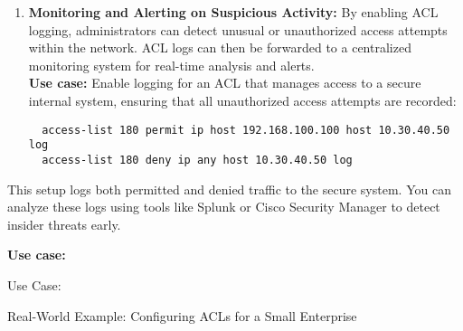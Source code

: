 \documentclass[11pt,a4paper]{article}
\begin{document}
\begin{enumerate}
            \item \textbf{Monitoring and Alerting on Suspicious Activity:} By enabling ACL logging, administrators can detect unusual or unauthorized access attempts within the network. ACL logs can then be forwarded to a centralized monitoring system for real-time analysis and alerts.
            \\[1em]
            \textbf{Use case:} Enable logging for an ACL that manages access to a secure internal system, ensuring that all unauthorized access attempts are recorded:

\begin{lstlisting}
  access-list 180 permit ip host 192.168.100.100 host 10.30.40.50 log
  access-list 180 deny ip any host 10.30.40.50 log                             
\end{lstlisting}
        \end{enumerate}

            This setup logs both permitted and denied traffic to the secure system. You can analyze these logs using tools like Splunk or Cisco Security Manager to detect insider threats early.


\newpage


                \textbf{Use case:} 





Use Case:



Real-World Example: Configuring ACLs for a Small Enterprise






                




\newpage


\begin{multicols}{2}
    \small
    
    \makeatletter
  \renewcommand\@biblabel[1]{#1.} 
    
   
\end{multicols}
  
\end{document}
